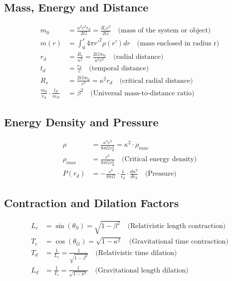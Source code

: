 \documentclass{article}
\begin{document}
\subsection{Mass, Energy and Distance}

\begin{align}
    m_0 &= \frac{\kappa^2 c^2 r_{d}}{2G} = \frac{R_s c^2}{2G} \quad \text{(mass of the system or object)}\\
    m(r) &=\int_{0}^{r}4\pi r'^{2}\rho(r')dr \quad \text{(mass enclosed in radius r)} \\
    r_{d} &= \frac{R_s}{\kappa^2} = \frac{2Gm_0}{\kappa^2 c^2}  \quad \text{(radial distance)}\\
    t_{d} &= \frac{r_{d}}{c}  \quad \text{(temporal distance)}\\
    R_s &= \frac{2Gm_0}{c^2}=\kappa^2 r_{d} \quad \text{(critical radial distance)} \\
    \frac{m_0}{r_{d}} \cdot \frac{l_P}{m_P} &= \beta^2 \quad \text{(Universal mass-to-distance ratio)}
\end{align}

\subsection{Energy Density and Pressure}

\begin{align}
    \rho &= \frac{\kappa^2 c^2}{8\pi G r_{d}^2} = \kappa^2 \cdot \rho_{max} \\
    \rho_{max} &= \frac{c^2}{8\pi G r_{d}^2} \quad \text{(Critical energy density)} \\
    P(r_{d}) &= - \frac{c^2}{8\pi G} \cdot \frac{1}{r_{d}} \cdot \frac{d\kappa^2}{dr_{d}} \quad \text{(Pressure)}
\end{align}

\subsection{Contraction and Dilation Factors}

\begin{align}
    L_c &= \sin\left(\theta_S\right) = \sqrt{1 - \beta^2} \quad \text{(Relativistic length contraction)} \\
    T_c &= \cos\left(\theta_G\right) = \sqrt{1 - \kappa^2} \quad \text{(Gravitational time contraction)} \\
    T_d &= \frac{1}{L_c} = \frac{1}{\sqrt{1-\beta^2}} \quad \text{(Relativistic time dilation)} \\
    L_d &= \frac{1}{T_c} = \frac{1}{\sqrt{1-\kappa^2}} \quad \text{(Gravitational length dilation)}
\end{align}
\end{document}
